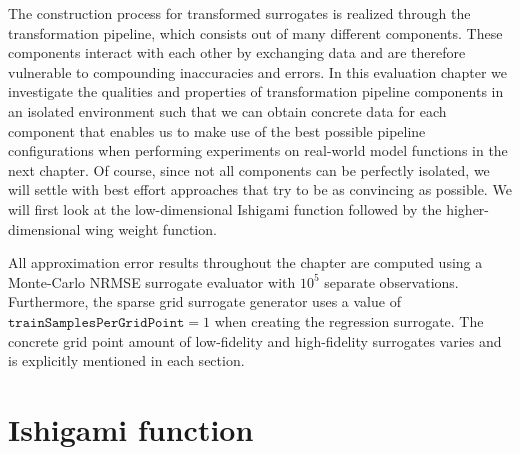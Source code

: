\documentclass[
  a4paper,  %
  twoside,  %
  bibliography=totoc,
  headsepline,
  cleardoublepage=empty,
  parskip=half,
  draft=false
]{scrbook}
\begin{document}
The construction process for transformed surrogates is realized through the transformation pipeline, which consists out of many different components.
These components interact with each other by exchanging data and are therefore vulnerable to compounding inaccuracies and errors.
In this evaluation chapter we investigate the qualities and properties of transformation pipeline components in an isolated environment such that we can obtain concrete data for each component that enables us to make use of the best possible pipeline configurations when performing experiments on real-world model functions in the next chapter.
Of course, since not all components can be perfectly isolated, we will settle with best effort approaches that try to be as convincing as possible.
We will first look at the low-dimensional Ishigami function followed by the higher-dimensional wing weight function.

All approximation error results throughout the chapter are computed using a Monte-Carlo NRMSE surrogate evaluator with $10^5$ separate observations.
Furthermore, the sparse grid surrogate generator uses a value of $\texttt{trainSamplesPerGridPoint}=1$ when creating the regression surrogate.
The concrete grid point amount of low-fidelity and high-fidelity surrogates varies and is explicitly mentioned in each section.

\section{Ishigami function}
\end{document}
